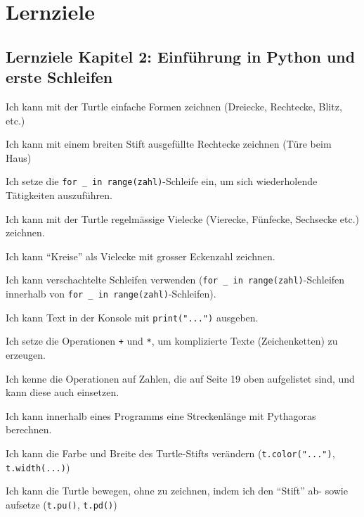 \chapter{Lernziele}

\section{Lernziele Kapitel 2: Einführung in Python und erste Schleifen}
\begin{todolist}
    \item Ich kann mit der Turtle einfache Formen zeichnen (Dreiecke, Rechtecke, Blitz, etc.)
    \item Ich kann mit einem breiten Stift ausgefüllte Rechtecke zeichnen (Türe beim Haus)
    \item Ich setze die \lstinline|for _ in range(zahl)|-Schleife ein, um sich wiederholende Tätigkeiten auszuführen.
    \item Ich kann mit der Turtle regelmässige Vielecke (Vierecke, Fünfecke, Sechsecke etc.) zeichnen.
    \item Ich kann ``Kreise'' als Vielecke mit grosser Eckenzahl zeichnen.
    \item Ich kann verschachtelte Schleifen verwenden (\lstinline|for _ in range(zahl)|-Schleifen innerhalb von \lstinline|for _ in range(zahl)|-Schleifen).
    \item Ich kann Text in der Konsole mit \lstinline|print("...")| ausgeben.
    \item Ich setze die Operationen \lstinline|+| und \lstinline|*|, um komplizierte Texte (Zeichenketten) zu erzeugen.
    \item Ich kenne die Operationen auf Zahlen, die auf Seite 19 oben aufgelistet sind, und kann diese auch einsetzen.
    \item Ich kann innerhalb eines Programms eine Streckenlänge mit Pythagoras berechnen.
    \item Ich kann die Farbe und Breite des Turtle-Stifts verändern (\lstinline|t.color("...")|, \lstinline|t.width(...)|)
    \item Ich kann die Turtle bewegen, ohne zu zeichnen, indem ich den \enquote{Stift} ab- sowie aufsetze (\lstinline|t.pu()|, \lstinline|t.pd()|)
\end{todolist}
